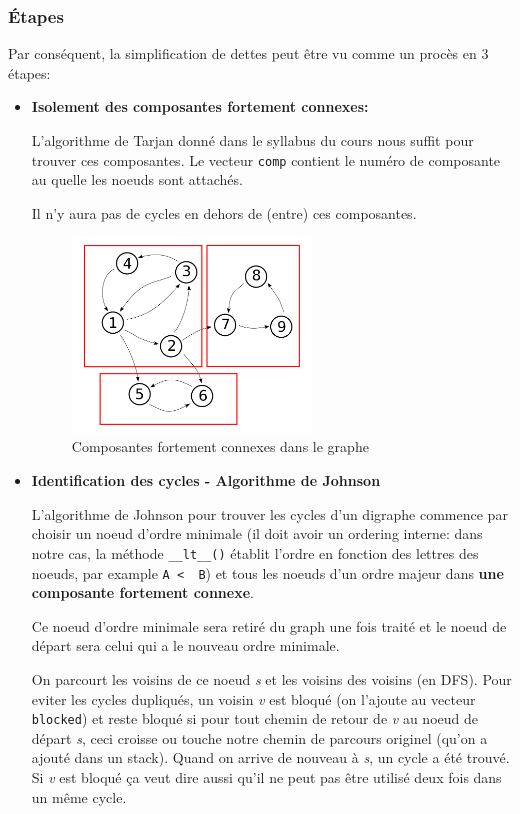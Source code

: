 \documentclass[11pt,a4paper]{article}
\begin{document}
\subsubsection{Étapes}

Par conséquent, la simplification de dettes peut être vu comme un
procès en 3 étapes:

\begin{itemize}
\item \textbf{Isolement des composantes fortement connexes:}

  L'algorithme de Tarjan donné dans le syllabus du cours \cite{syl}
nous suffit pour trouver ces composantes. Le vecteur \texttt{comp}
contient le numéro de composante au quelle les noeuds sont attachés.

Il n'y aura pas de cycles en dehors de (entre) ces composantes.

\begin{figure}[ht!]  \centering
  \includegraphics[width=0.6\textwidth]{graph-connexe.png}
  \caption{Composantes fortement connexes dans le graphe}
  \label{fig:normal2}
\end{figure}


\item \textbf{Identification des cycles - Algorithme de Johnson
    \cite{johnson}}

  L'algorithme de Johnson pour trouver les cycles d'un digraphe
  commence par choisir un noeud d'ordre minimale (il doit avoir un
  ordering interne: dans notre cas, la méthode \texttt{\_\_lt\_\_()}
  établit l'ordre en fonction des lettres des noeuds, par example
  \texttt{A\ < \ B}) et tous les noeuds d'un ordre majeur dans
  \textbf{une composante fortement connexe}.

  Ce noeud d'ordre minimale sera retiré du graph une fois traité et le
  noeud de départ sera celui qui a le nouveau ordre minimale.

  On parcourt les voisins de ce noeud \emph{s} et les voisins des
  voisins (en DFS). Pour eviter les cycles dupliqués, un voisin
  \emph{v} est bloqué (on l'ajoute au vecteur \texttt{blocked}) et
  reste bloqué si pour tout chemin de retour de \emph{v} au noeud de
  départ \emph{s}, ceci croisse ou touche notre chemin de parcours
  originel (qu'on a ajouté dans un stack). Quand on arrive de nouveau
  à \emph{s}, un cycle a été trouvé. Si \emph{v} est bloqué ça veut
  dire aussi qu'il ne peut pas être utilisé deux fois dans un même cycle.


\end{itemize}
\end{document}
